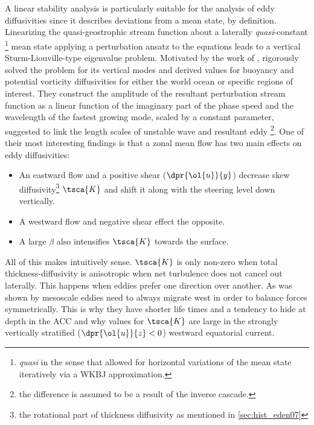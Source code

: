 \section*{\citealt{Eden2011a,eden2012implementing,Vollmer2013a}}\label{sec:hist_eden-linstab}
A linear stability analysis is particularly suitable for the analysis of eddy
diffusivities since it describes deviations from a mean state, by definition.
Linearizing the quasi-geostrophic stream function about a laterally
\textit{quasi}-constant \footnote{\textit{quasi} in the sense that \eg
\citeauthor*{Vollmer2013a} allowed for horizontal variations of the mean state
iteratively via a WKBJ approximation.} mean state \ie applying a perturbation
ansatz to the equations leads to a vertical Sturm-Liouville-type eigenvalue
problem. Motivated by the work of \cite{Smith2007},
\citeauthor{Eden2011a,eden2012implementing,Vollmer2013a} rigorously solved the
problem for its vertical modes and derived values for buoyancy and potential
vorticity diffusivities for either the world ocean or specific regions of
interest.  They construct the amplitude of the resultant perturbation stream
function as a linear function of the imaginary part of the phase speed and the
wavelength of the fastest growing mode, scaled by a
constant parameter, suggested to link the length scales of unstable wave and resultant eddy \footnote{the difference is assumed to be a result of the inverse cascade.}. One of their most interesting findings is that a zonal mean flow has two main effects on eddy diffusivities:
\begin{itemize}
	\item
	An eastward flow and a positive shear ($\dpr{\ol{u}}{y}$) decrease skew diffusivity\footnote{\ie the rotational part of thickness diffusivity as mentioned in \ref{sec:hist_eden07}} $\tsca{K}$  and shift it along with the steering level down vertically.
	\item
	A westward flow and negative shear effect the opposite.
	\item
	A large $\beta$ also intensifies $\tsca{K}$ towards the surface.
\end{itemize}
All of this makes intuitively sense. $\tsca{K}$ is only non-zero when total
thickness-diffusivity is anisotropic \ie when net turbulence does not cancel out
laterally. This happens when eddies prefer one direction over another. As was
shown by \cite{Cushman-Roisin1990} mesoscale eddies need to always migrate west
in order to balance forces symmetrically. This is why they have shorter life
times and a tendency to hide at depth in the ACC and why values for $\tsca{K}$
are large in the strongly vertically stratified ($\dpr{\ol{u}}{z}<0$) westward
equatorial current.
